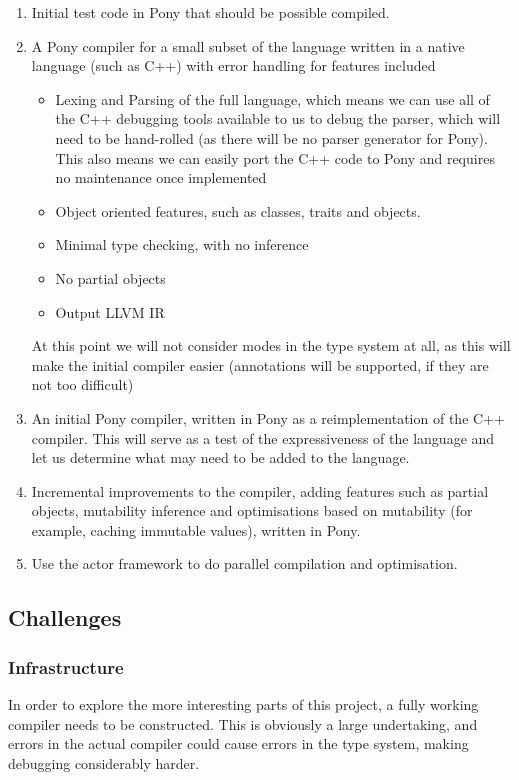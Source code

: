 \documentclass{article}
\begin{document}
\begin{enumerate}
	\item Initial test code in Pony that should be possible compiled.
	\item A Pony compiler for a small subset of the language written in a native language (such as C++) with error handling for features included
		\begin{itemize}
			\item Lexing and Parsing of the full language, which means we can use all of the C++ debugging tools available to us to debug the parser, which will need to be hand-rolled (as there will be no parser generator for Pony).
				This also means we can easily port the C++ code to Pony and requires no maintenance once implemented
			\item Object oriented features, such as classes, traits and objects.
			\item Minimal type checking, with no inference
			\item No partial objects
			\item Output LLVM IR
		\end{itemize}
	At this point we will not consider modes in the type system at all, as this will make the initial compiler easier (annotations will be supported, if they are not too difficult)
	\item An initial Pony compiler, written in Pony as a reimplementation of the C++ compiler.
		This will serve as a test of the expressiveness of the language and let us determine what may need to be added to the language.
	\item Incremental improvements to the compiler, adding features such as partial objects, mutability inference and optimisations based on mutability (for example, caching immutable values), written in Pony.
    	\item Use the actor framework to do parallel compilation and optimisation.
\end{enumerate}

\subsection{Challenges}

\subsubsection{Infrastructure}

In order to explore the more interesting parts of this project, a fully working compiler needs to be constructed.
This is obviously a large undertaking, and errors in the actual compiler could cause errors in the type system, making debugging considerably harder.
\end{document}
